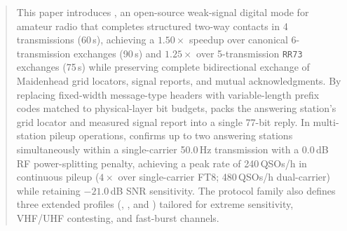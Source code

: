 %
%
%
%
%
%


\begin{abstract}
\noindent
This paper introduces , an open-source weak-signal digital mode for amateur radio that completes structured two-way contacts in 4 transmissions (60\,s), achieving a $1.50\times$ speedup over canonical 6-transmission exchanges (90\,s) and $1.25\times$ over 5-transmission \texttt{RR73} exchanges (75\,s) while preserving complete bidirectional exchange of Maidenhead grid locators, signal reports, and mutual acknowledgments.
By replacing fixed-width message-type headers with variable-length prefix codes matched to physical-layer bit budgets,  packs the answering station's grid locator and measured signal report into a single 77-bit reply.
In multi-station pileup operations,  confirms up to two answering stations simultaneously within a single-carrier 50.0\,Hz transmission with a 0.0\,dB RF power-splitting penalty, achieving a peak rate of 240\,QSOs/h in continuous pileup ($4\times$ over single-carrier FT8; 480\,QSOs/h dual-carrier) while retaining $-21.0$\,dB SNR sensitivity.
The protocol family also defines three extended profiles (, , and ) tailored for extreme sensitivity, VHF/UHF contesting, and fast-burst channels.
\end{abstract}

